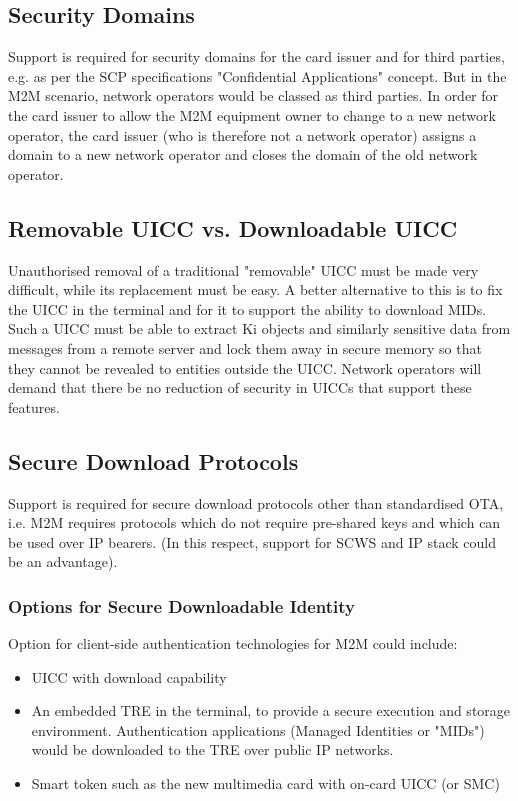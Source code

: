 \documentclass[12pt]{article}
\begin{document}
\subsection{Security Domains}
Support is required for security domains for the card issuer and for third parties, e.g. as per the SCP specifications "Confidential Applications" concept. But in the M2M scenario, network operators would be classed as third parties. In order for the card issuer to allow the M2M equipment owner to change to a new network operator, the card issuer (who is therefore not a network operator) assigns a domain to a new network operator and closes the domain of the old network operator.

\subsection{Removable UICC vs. Downloadable UICC}
Unauthorised removal of a traditional "removable" UICC must be made very difficult, while its replacement must be easy. A better alternative to this is to fix the UICC in the terminal and for it to support the ability to download MIDs. Such a UICC must be able to extract Ki objects and similarly sensitive data from messages from a remote server and lock them away in secure memory so that they cannot be revealed to entities outside the UICC. Network operators will demand that there be no reduction of security in UICCs that support these features.

\subsection{Secure Download Protocols}
Support is required for secure download protocols other than standardised OTA, i.e. M2M requires protocols which do not require pre-shared keys and which can be used over IP bearers. (In this respect, support for SCWS and IP stack could be an advantage).


\subsubsection{Options for Secure Downloadable Identity} 
Option for client-side authentication technologies for M2M could include:
\begin{itemize}
\item UICC with download capability
\item An embedded TRE in the terminal, to provide a secure execution and storage
environment. Authentication applications (Managed Identities or "MIDs")
would be downloaded to the TRE over public IP networks.
\item Smart token such as the new multimedia card with on-card UICC (or SMC)

\end{itemize}
\end{document}
